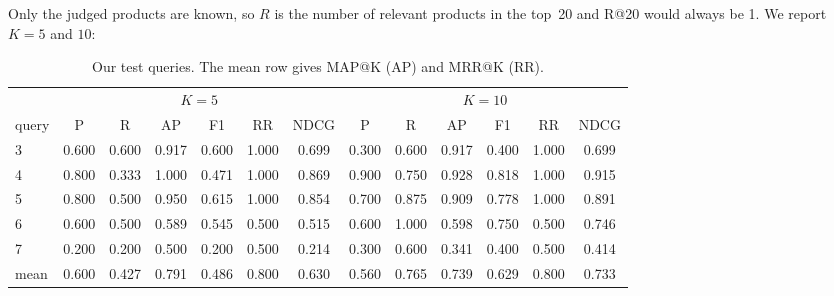 \documentclass[11pt,a4paper]{article}
\begin{document}
Only the judged products are known, so $R$ is the number of relevant products in the top~20 and R@20 would always be
1. We report $K = 5$ and $10$:

\begin{table}[H]
\centering\small
\setlength{\tabcolsep}{4.5pt}
\begin{tabular}{@{}l cccccc cccccc@{}}
\toprule
 & \multicolumn{6}{c}{$K=5$} & \multicolumn{6}{c}{$K=10$}\\
\cmidrule(lr){2-7}\cmidrule(l){8-13}
query & P & R & AP & F1 & RR & NDCG & P & R & AP & F1 & RR & NDCG\\
\midrule
3    & 0.600 & 0.600 & 0.917 & 0.600 & 1.000 & 0.699 & 0.300 & 0.600 & 0.917 & 0.400 & 1.000 & 0.699\\
4    & 0.800 & 0.333 & 1.000 & 0.471 & 1.000 & 0.869 & 0.900 & 0.750 & 0.928 & 0.818 & 1.000 & 0.915\\
5    & 0.800 & 0.500 & 0.950 & 0.615 & 1.000 & 0.854 & 0.700 & 0.875 & 0.909 & 0.778 & 1.000 & 0.891\\
6    & 0.600 & 0.500 & 0.589 & 0.545 & 0.500 & 0.515 & 0.600 & 1.000 & 0.598 & 0.750 & 0.500 & 0.746\\
7    & 0.200 & 0.200 & 0.500 & 0.200 & 0.500 & 0.214 & 0.300 & 0.600 & 0.341 & 0.400 & 0.500 & 0.414\\
\midrule
mean & 0.600 & 0.427 & 0.791 & 0.486 & 0.800 & 0.630 & 0.560 & 0.765 & 0.739 & 0.629 & 0.800 & 0.733\\
\bottomrule
\end{tabular}
\caption{Our test queries. The mean row gives MAP@K (AP) and MRR@K (RR).}
\end{table}
\end{document}
